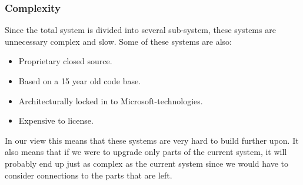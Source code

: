 \subsubsection{Complexity}Since the total system is divided into several sub-system, these systems are unnecessary complex and slow. Some of these systems are also:
\begin{itemize}
\item Proprietary closed source.
\item Based on a 15 year old code base.
\item Architecturally locked in to Microsoft-technologies.
\item Expensive to license.
\end{itemize}
In our view this means that these systems are very hard to build further upon. It also means that if we were to upgrade only parts of the current system, it will probably end up just as complex as the current system since we would have to consider connections to the parts that are left.

